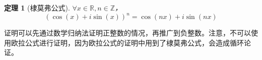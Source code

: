 \documentclass[a4paper,openany]{ctexbook}
\newtheorem{thmlevel1}{定理}[chapter]
\begin{document}

\begin{thmlevel1}[棣莫弗公式]
    \(\forall x\in \mathbb{R}, n\in \mathbb{Z}\)，\[( \cos (x) + i \sin (x) )^n = \cos (nx) + i \sin (nx)\]
\end{thmlevel1}

证明可以先通过数学归纳法证明正整数的情况，再推广到负整数。注意，不可以使用欧拉公式进行证明，因为欧拉公式的证明中用到了棣莫弗公式，会造成循环论证。
\end{document}
